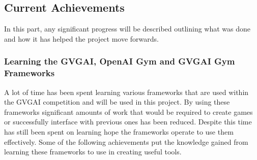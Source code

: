 \documentclass[a4paper]{article}
\begin{document}
\subsection{Current Achievements}
In this part, any significant progress will be described outlining what was done and how it has helped the project move forwards.

\subsubsection{Learning the GVGAI, OpenAI Gym and GVGAI Gym Frameworks}
A lot of time has been spent learning various frameworks that are used within the GVGAI competition and will be used in this project.
By using these frameworks significant amounts of work that would be required to create games or successfully interface with previous ones has been reduced.
Despite this time has still been spent on learning hope the frameworks operate to use them effectively.
Some of the following achievements put the knowledge gained from learning these frameworks to use in creating useful tools.
\end{document}
